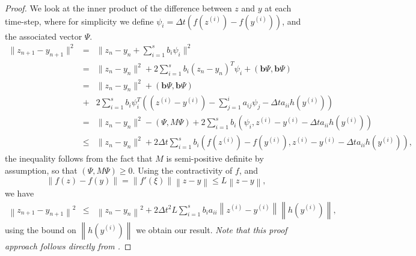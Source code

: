 \documentclass{siamart251104}
\newcommand{\dt}{\Delta t}
\newcommand{\m}[1]{\mathbf{#1}}
\newcommand{\vb}{\m{b}}
\begin{document}
\begin{proof}
We look at the inner product of the difference between $z$ and $y$ at each time-step, where for simplicity we define
$\psi_i = \dt ( f(z^{(i)}) - f(y^{(i)})) $, and the associated vector $\Psi$.
\begin{eqnarray*}
\|z_{n+1} - y_{n+1}\|^2   &=&  \|z_n - y_n +
 \sum_{i=1}^s b_{i}  \psi_i  \|^2 \\
 &=& \| z_n - y_n\|^2 +
2  \sum_{i=1}^s b_{i} (z_n - y_n)^T \psi_i
 + \left( \vb \Psi ,\vb \Psi \right) \\
  &=&  \| z_n - y_n\|^2 
 + \left( \vb \Psi ,\vb \Psi \right)  \\ 
 & + & 2 \sum_{i=1}^s b_{i} \psi_i^T \left(
    ( z^{(i)} -  y^{(i)} ) -  \sum_{j=1}^{i} a_{ij} \psi_j 
    - \dt a_{ii} h(y^{(i)})
    \right) \\
    &=&  \| z_n - y_n\|^2  - \left(  \Psi ,M \Psi \right) 
+ 2 \sum_{i=1}^s b_{i} 
 \left( \psi_i, z^{(i)} -  y^{(i)}  - \dt a_{ii} h(y^{(i)}) \right)  \\
& \leq & \| z_n - y_n\|^2 + 2 \dt \sum_{i=1}^s b_{i} 
 \left( f(z^{(i)}) -  f(y^{(i)}) , z^{(i)} -  y^{(i)} 
 - \dt a_{ii}  h(y^{(i)}) \right) ,
\end{eqnarray*}
the inequality follows from the fact that   $M$ is semi-positive definite by assumption, 
so that $( \Psi, M \Psi)  \geq 0$.
  Using the contractivity of $f$,
 and 
\[ \left\| f(z) -  f(y) \right\| 
= \left\| f'(\xi) \right\| \left\| z -  y \right\|  \leq L \left\|z -  y \right\| ,\] we have 
 \begin{eqnarray*}
\left\| z_{n+1} - y_{n+1} \right\|^2  
& \leq &
\left\| z_n - y_n\right\|^2   + 
 2 \dt^2 L \sum_{i=1}^s b_{i} a_{ii} 
 \left\|z^{(i)} -  y^{(i)} \right\|
\left\| h(y^{(i)})\right\| ,
 \end{eqnarray*}
 using the bound on $\left\| h(y^{(i)})\right\|$
we obtain our result.
{\em Note that this proof approach follows directly from
 \cite{CrouzeixBstab}.}
\end{proof}
\end{document}
